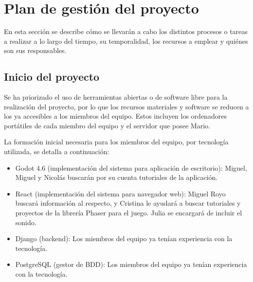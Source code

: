 \documentclass[11pt]{article}
\begin{document}
\section{Plan de gestión del proyecto}
\label{sec:plan}
En esta sección se describe cómo se llevarán a cabo los distintos procesos o
tareas a realizar a lo largo del tiempo, su temporalidad, los recursos a
emplear y quiénes son sus responsables.

\subsection{Inicio del proyecto} %
Se ha priorizado el uso de herramientas abiertas o de software libre para la
realización del proyecto, por lo que los recursos materiales y software 
se reducen a los ya accesibles a los miembros del equipo. Estos incluyen los
ordenadores portátiles de cada miembro del equipo y el servidor que posee
Mario.

La formación inicial necesaria para los miembros del equipo, por tecnología
utilizada, se detalla a continuación:
\begin{itemize}
		\item Godot 4.6 (implementación del sistema para aplicación de escritorio): Miguel, Miguel y Nicolás buscarán por su cuenta tutoriales de la aplicación.
		\item React (implementación del sistema para navegador web): Miguel Royo buscará información al respecto, y Cristina le ayudará a buscar tutoriales y proyectos de la librería Phaser para el juego. Julia se encargará de incluir el sonido.
		\item Django (backend): Los miembros del equipo ya tenían experiencia con la tecnología.
		\item PostgreSQL (gestor de BDD): Los miembros del equipo ya tenían
				experiencia con la tecnología.
\end{itemize}
\end{document}
